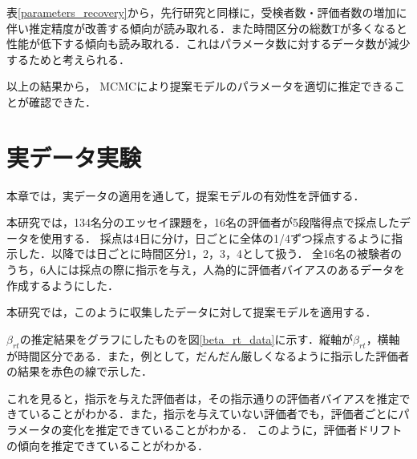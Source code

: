 \documentclass[dvipdfmx, twocolumn, a4paper]{hcresume}
\begin{document}
表\ref{parameters_recovery}から，先行研究と同様に，受検者数・評価者数の増加に伴い推定精度が改善する傾向が読み取れる．また時間区分の総数Tが多くなると性能が低下する傾向も読み取れる．これはパラメータ数に対するデータ数が減少するためと考えられる．

以上の結果から， MCMCにより提案モデルのパラメータを適切に推定できることが確認できた．

\section{実データ実験}
本章では，実データの適用を通して，提案モデルの有効性を評価する．

本研究では，134名分のエッセイ課題を，16名の評価者が5段階得点で採点したデータを使用する．
採点は4日に分け，日ごとに全体の1/4ずつ採点するように指示した．以降では日ごとに時間区分1，2，3，4として扱う．
全16名の被験者のうち，6人には採点の際に指示を与え，人為的に評価者バイアスのあるデータを作成するようにした．


本研究では，このように収集したデータに対して提案モデルを適用する．

$\beta_{rt}$の推定結果をグラフにしたものを図\ref{beta_rt_data}に示す．縦軸が$\beta_{rt}$，横軸が時間区分である．また，例として，だんだん厳しくなるように指示した評価者の結果を赤色の線で示した．

これを見ると，指示を与えた評価者は，その指示通りの評価者バイアスを推定できていることがわかる．また，指示を与えていない評価者でも，評価者ごとにパラメータの変化を推定できていることがわかる．
このように，評価者ドリフトの傾向を推定できていることがわかる．
\end{document}
